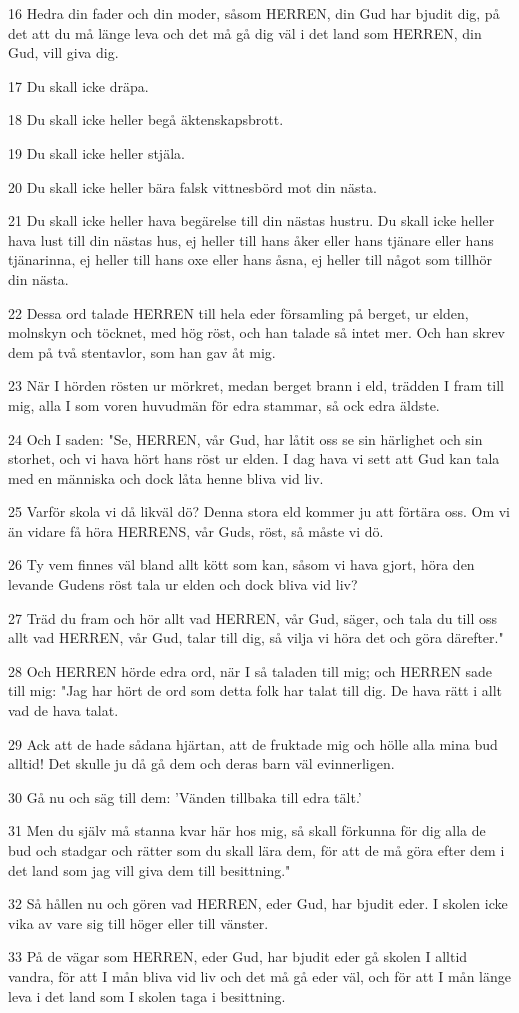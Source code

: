 \par 16 Hedra din fader och din moder, såsom HERREN, din Gud har bjudit dig, på det att du må länge leva och det må gå dig väl i det land som HERREN, din Gud, vill giva dig.
\par 17 Du skall icke dräpa.
\par 18 Du skall icke heller begå äktenskapsbrott.
\par 19 Du skall icke heller stjäla.
\par 20 Du skall icke heller bära falsk vittnesbörd mot din nästa.
\par 21 Du skall icke heller hava begärelse till din nästas hustru. Du skall icke heller hava lust till din nästas hus, ej heller till hans åker eller hans tjänare eller hans tjänarinna, ej heller till hans oxe eller hans åsna, ej heller till något som tillhör din nästa.
\par 22 Dessa ord talade HERREN till hela eder församling på berget, ur elden, molnskyn och töcknet, med hög röst, och han talade så intet mer. Och han skrev dem på två stentavlor, som han gav åt mig.
\par 23 När I hörden rösten ur mörkret, medan berget brann i eld, trädden I fram till mig, alla I som voren huvudmän för edra stammar, så ock edra äldste.
\par 24 Och I saden: "Se, HERREN, vår Gud, har låtit oss se sin härlighet och sin storhet, och vi hava hört hans röst ur elden. I dag hava vi sett att Gud kan tala med en människa och dock låta henne bliva vid liv.
\par 25 Varför skola vi då likväl dö? Denna stora eld kommer ju att förtära oss. Om vi än vidare få höra HERRENS, vår Guds, röst, så måste vi dö.
\par 26 Ty vem finnes väl bland allt kött som kan, såsom vi hava gjort, höra den levande Gudens röst tala ur elden och dock bliva vid liv?
\par 27 Träd du fram och hör allt vad HERREN, vår Gud, säger, och tala du till oss allt vad HERREN, vår Gud, talar till dig, så vilja vi höra det och göra därefter."
\par 28 Och HERREN hörde edra ord, när I så taladen till mig; och HERREN sade till mig: "Jag har hört de ord som detta folk har talat till dig. De hava rätt i allt vad de hava talat.
\par 29 Ack att de hade sådana hjärtan, att de fruktade mig och hölle alla mina bud alltid! Det skulle ju då gå dem och deras barn väl evinnerligen.
\par 30 Gå nu och säg till dem: 'Vänden tillbaka till edra tält.'
\par 31 Men du själv må stanna kvar här hos mig, så skall förkunna för dig alla de bud och stadgar och rätter som du skall lära dem, för att de må göra efter dem i det land som jag vill giva dem till besittning."
\par 32 Så hållen nu och gören vad HERREN, eder Gud, har bjudit eder. I skolen icke vika av vare sig till höger eller till vänster.
\par 33 På de vägar som HERREN, eder Gud, har bjudit eder gå skolen I alltid vandra, för att I mån bliva vid liv och det må gå eder väl, och för att I mån länge leva i det land som I skolen taga i besittning.

